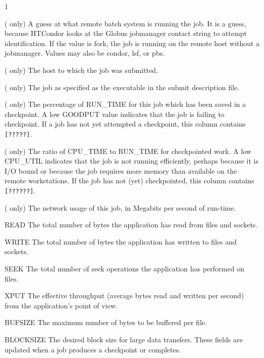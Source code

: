 \begin{ManPage}{\label{man-condor-q}}{1}
\begin{description}
  ( only) A guess at what remote batch system is running the job.
  It is a guess, because HTCondor looks at the Globus jobmanager contact
  string to attempt identification.
  If the value is fork, the job is running on the
  remote host without a jobmanager.
  Values may also be condor, lsf, or pbs.
\item[HOST] ( only) The host to which the job was submitted.
\item[EXECUTABLE] ( only) The job as specified as the
  executable in the submit description file.
\item[GOODPUT] ( only) The percentage of RUN\_TIME for this job which has been
  saved in a checkpoint.  A low GOODPUT value indicates that the job is
  failing to checkpoint.  If a job has not yet attempted a checkpoint,
  this column contains \texttt{[?????]}.
\item[CPU\_UTIL] ( only) The ratio of CPU\_TIME to RUN\_TIME for checkpointed
  work.  A low CPU\_UTIL indicates that the job is not running
  efficiently, perhaps because it is I/O bound or because the job
  requires more memory than available on the remote workstations.  If
  the job has not (yet) checkpointed, this column contains \texttt{[??????]}.
\item[Mb/s] ( only) The network usage of this job, in
  Megabits per second of run-time.
  \item{READ} The total number of bytes the application has read from
    files and sockets.
  \item{WRITE} The total number of bytes the application has written to
    files and sockets.
  \item{SEEK} The total number of seek operations the application has
    performed on files.
  \item{XPUT} The effective throughput (average bytes read and written
    per second)
  from the application's point of view.
  \item{BUFSIZE} The maximum number of bytes to be buffered per file.
  \item{BLOCKSIZE} The desired block size for large data transfers.
    These fields are updated when a job produces a checkpoint or completes.

\end{description}
\end{ManPage}
